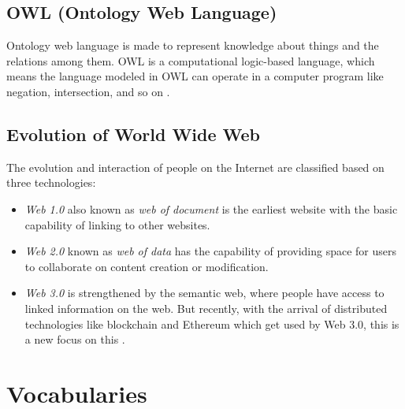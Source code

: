 \subsection{OWL (Ontology Web Language) }
Ontology web language is made to represent knowledge about things and the relations among them. OWL is a computational logic-based language, which means the language modeled in OWL can operate in a computer program like negation, intersection, and so on \cite{Hector}.
\subsection{Evolution of World Wide Web}
The evolution and interaction of people on the Internet are classified based on three technologies: \\
\begin{itemize}
\item\textit{Web 1.0} also known as \textit{web of document} is the earliest website with the basic capability of linking to other websites. \\
\item\textit{Web 2.0} known as \textit{web of data} has the capability of providing space for users to collaborate on content creation or modification.\\
\item\textit{Web 3.0} is strengthened by the semantic web, where people have access to linked information on the web. But recently, with the arrival of distributed technologies like blockchain and Ethereum which get used by Web 3.0, this is a new focus on this \cite{Kujur}.
\end{itemize}

\section{Vocabularies}
